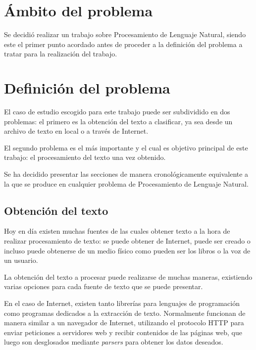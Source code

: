 \section{Ámbito del problema}

Se decidió realizar un trabajo sobre Procesamiento de Lenguaje Natural, siendo este el primer punto acordado antes de proceder a la definición del problema a tratar para la realización del trabajo.

\section{Definición del problema}

El caso de estudio escogido para este trabajo puede ser subdividido en dos problemas: el primero es la obtención del texto a clasificar, ya sea desde un archivo de texto en local o a través de Internet.

El segundo problema es el más importante y el cual es objetivo principal de este trabajo: el procesamiento del texto una vez obtenido.

Se ha decidido presentar las secciones de manera cronológicamente equivalente a la que se produce en cualquier problema de Procesamiento de Lenguaje Natural.



\subsection{Obtención del texto}

Hoy en día existen muchas fuentes de las cuales obtener texto a la hora de realizar procesamiento de texto: se puede obtener de Internet, puede ser creado o incluso puede obtenerse de un medio físico como pueden ser los libros o la voz de un usuario.

La obtención del texto a procesar puede realizarse de muchas maneras, existiendo varias opciones para cada fuente de texto que se puede presentar. 

En el caso de Internet, existen tanto librerías para lenguajes de programación como programas dedicados a la extracción de texto. Normalmente funcionan de manera similar a un navegador de Internet, utilizando el protocolo HTTP para enviar peticiones a servidores web y recibir contenidos de las páginas web, que luego son desglosados mediante \textit{parsers} para obtener los datos deseados.

